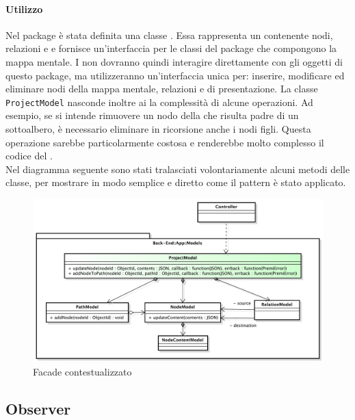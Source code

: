 \paragraph{Utilizzo}
Nel package \texttt{} è stata definita una classe  \texttt{}. Essa rappresenta un  contenente nodi, relazioni e  e  fornisce un'interfaccia per le classi del package che compongono la mappa mentale. I  non dovranno quindi interagire direttamente con gli oggetti di questo package, ma utilizzeranno un'interfaccia unica per: inserire, modificare ed eliminare nodi della mappa mentale, relazioni e  di presentazione. La classe \texttt{ProjectModel} nasconde inoltre ai  la complessità di alcune operazioni. Ad esempio, se si intende rimuovere un nodo della  che risulta padre di un sottoalbero, è necessario eliminare in ricorsione anche i nodi figli. Questa operazione sarebbe particolarmente costosa e renderebbe molto complesso il codice del .\\
Nel diagramma seguente sono stati tralasciati volontariamente alcuni metodi delle classe, per mostrare in modo semplice e diretto come il pattern è stato applicato.\\
\begin{center}
\begin{figure}[h]
\centering
\includegraphics[scale=0.33,keepaspectratio]{diagrammi/designPatterns/facade.pdf}
\caption{Facade contestualizzato}
\end{figure}
\FloatBarrier
\end{center}
\subsection{Observer}\label{Observer}
